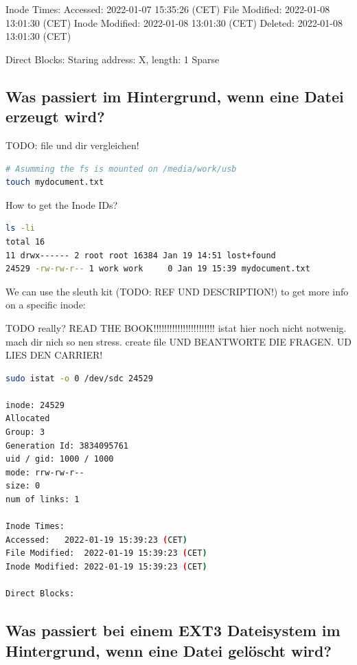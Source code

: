 Inode Times:
Accessed:	2022-01-07 15:35:26 (CET)
File Modified:	2022-01-08 13:01:30 (CET)
Inode Modified:	2022-01-08 13:01:30 (CET)
Deleted:	2022-01-08 13:01:30 (CET)

Direct Blocks:
Staring address: X, length: 1  Sparse



\subsection{Was passiert im Hintergrund, wenn eine Datei erzeugt wird?}

TODO: file und dir vergleichen!

\begin{lstlisting}[language=bash]
# Asumming the fs is mounted on /media/work/usb
touch mydocument.txt
\end{lstlisting} 

How to get the Inode IDs?

\begin{lstlisting}[language=bash]
ls -li
total 16
11 drwx------ 2 root root 16384 Jan 19 14:51 lost+found
24529 -rw-rw-r-- 1 work work     0 Jan 19 15:39 mydocument.txt
\end{lstlisting} 


We can use the sleuth kit (TODO: REF UND DESCRIPTION!) to get more info on a specific inode:

TODO really? READ THE BOOK!!!!!!!!!!!!!!!!!!!!!!!
istat hier noch nicht notwenig.
mach dir nich so nen stress. create file UND BEANTWORTE DIE FRAGEN. 
UD LIES DEN CARRIER!

\begin{lstlisting}[language=bash]
sudo istat -o 0 /dev/sdc 24529

inode: 24529
Allocated
Group: 3
Generation Id: 3834095761
uid / gid: 1000 / 1000
mode: rrw-rw-r--
size: 0
num of links: 1

Inode Times:
Accessed:	2022-01-19 15:39:23 (CET)
File Modified:	2022-01-19 15:39:23 (CET)
Inode Modified:	2022-01-19 15:39:23 (CET)

Direct Blocks:
\end{lstlisting} 







\subsection{Was passiert bei einem EXT3 Dateisystem im Hintergrund, wenn eine Datei gelöscht wird?}

